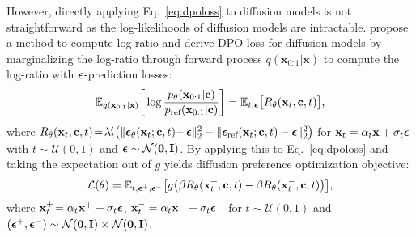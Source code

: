 However, directly applying Eq.~\eqref{eq:dpoloss} to diffusion models is not straightforward as the log-likelihoods of diffusion models are intractable.
\citet{wallace2023diffusion} propose a method to compute log-ratio and derive DPO loss for diffusion models by marginalizing the log-ratio through forward process $q(\mathbf{x}_{0:1}|\mathbf{x})$ to compute the log-ratio with $\boldsymbol{\epsilon}$-prediction losses: 
\begin{equation*}\label{eq:diffratio}
    \mathbb{E}_{q(\mathbf{x}_{0:1}|\mathbf{x})}\bigg[\log \frac{p_\theta(\mathbf{x}_{0:1}|\mathbf{c})}{p_{\textrm{ref}}(\mathbf{x}_{0:1}|\mathbf{c})}\bigg] = \mathbb{E}_{t,\eps}\big[ R_\theta(\mathbf{x}_t, \mathbf{c}, t)\big]\text{,}%
\end{equation*}
where  $R_\theta(\mathbf{x}_t, \mathbf{c}, t)  \! = \!  \lambda_t'\big(\|\boldsymbol{\epsilon}_\theta(\mathbf{x}_t;\mathbf{c},t) -$$ \boldsymbol{\epsilon}\|_2^2 - \|\boldsymbol{\epsilon}_{\textrm{ref}}(\mathbf{x}_t;\mathbf{c},t) -\boldsymbol{\epsilon}\|_2^2\big)$ 
for $\mathbf{x}_t=\alpha_t\mathbf{x}+\sigma_t\boldsymbol{\epsilon}$ with $t\sim\mathcal{U}(0,1)$ and $\boldsymbol{\epsilon}\sim\mathcal{N}(\boldsymbol{0},\mathbf{I})$. 
By applying this to Eq.~\eqref{eq:dpoloss} and taking the expectation out of $g$ yields diffusion preference optimization objective:
\begin{equation}\label{eq:dffpo}
    \mathcal{L}(\theta) = \mathbb{E}_{t,\boldsymbol{\epsilon}^+, \boldsymbol{\epsilon}^-}\big[g\big(\beta R_\theta(\mathbf{x}_t^+, \mathbf{c}, t) - \beta R_\theta(\mathbf{x}_t^-,\mathbf{c}, t) \big)\big]\text{,}
\end{equation}
where $\mathbf{x}_t^+ \! =  \alpha_t\mathbf{x}^+ + \sigma_t\boldsymbol{\epsilon}$, $\mathbf{x}_t^-=\alpha_t\mathbf{x}^- + \sigma_t\boldsymbol{\epsilon}^-$ for $t\sim\mathcal{U}(0,1)$ and $(\boldsymbol{\epsilon}^+, \boldsymbol{\epsilon}^-)\sim \mathcal{N}(\boldsymbol{0},\mathbf{I}) \times \mathcal{N}(\boldsymbol{0},\mathbf{I}) $.



